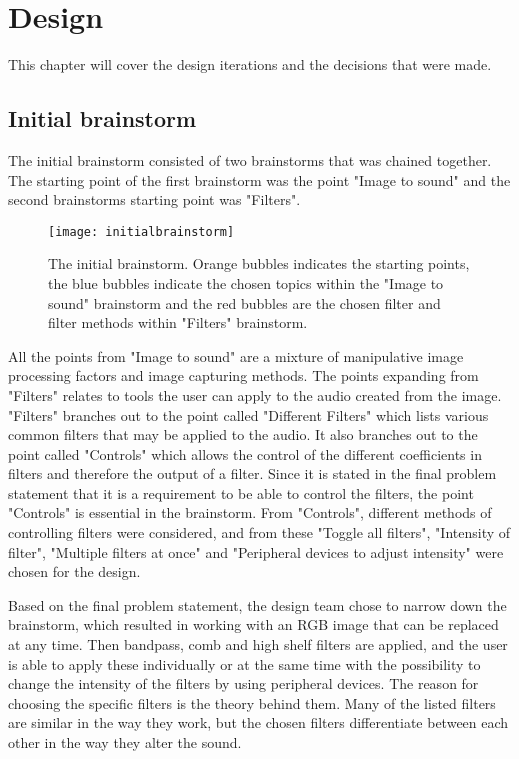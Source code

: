 \chapter{Design}\label{ch:design}
This chapter will cover the design iterations and the decisions that were made. 

\section{Initial brainstorm}\label{sec:initialbrainstorm}
The initial brainstorm consisted of two brainstorms that was chained together. The starting point of the first brainstorm was the point "Image to sound" and the second brainstorms starting point was "Filters". 

\begin{figure}[!h] 
\centering
\texttt{[image: initialbrainstorm]}
\caption{\label{fig:initialbrainstorm} The initial brainstorm. Orange bubbles indicates the starting points, the blue bubbles indicate the chosen topics within the "Image to sound" brainstorm and the red bubbles are the chosen filter and filter methods within "Filters" brainstorm.}
\end{figure}

All the points from "Image to sound" are a mixture of manipulative image processing factors and image capturing methods. 
The points expanding from "Filters" relates to tools the user can apply to the audio created from the image. 
"Filters" branches out to the point called "Different Filters" which lists various common filters that may be applied to the audio. It also branches out to the point called "Controls" which allows the control of the different coefficients in filters and therefore the output of a filter. 
Since it is stated in the final problem statement that it is a requirement to be able to control the filters, the point "Controls" is essential in the brainstorm. From "Controls", different methods of controlling filters were considered, and from these "Toggle all filters", "Intensity of filter", "Multiple filters at once" and "Peripheral devices to adjust intensity" were chosen for the design.

Based on the final problem statement, the design team chose to narrow down the brainstorm, which resulted in working with an RGB image that can be replaced at any time. Then bandpass, comb and high shelf filters are applied, and the user is able to apply these individually or at the same time with the possibility to change the intensity of the filters by using peripheral devices. 
The reason for choosing the specific filters is the theory behind them. Many of the listed filters are similar in the way they work, but the chosen filters differentiate between each other in the way they alter the sound.


